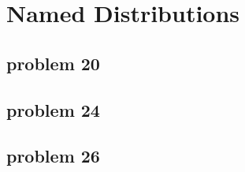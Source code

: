 \section{Named Distributions}

\subsection{problem 20}


\subsection{problem 24}


\subsection{problem 26}
